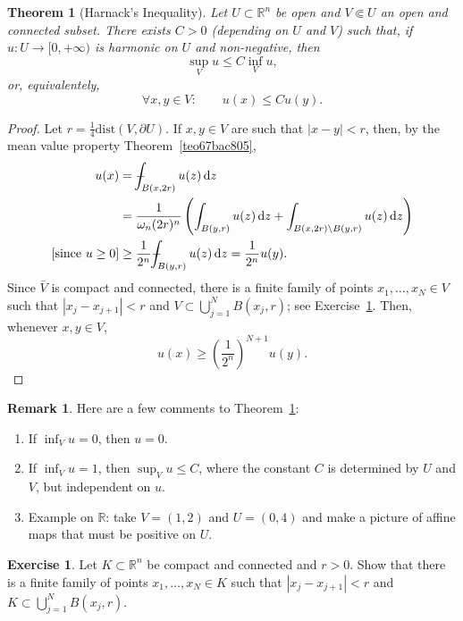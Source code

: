 \documentclass[a4paper,9pt]{amsart}
\newcommand{\R}{\mathbb{R}}	%
\newcommand{\did}{\,\mathrm{d}}	%
\newcommand{\de}{\partial}		%
\newcommand{\dist}{\mathrm{dist}}
\def\Xint#1{\mathchoice
      {\XXint\displaystyle\textstyle{#1}}%
      {\XXint\textstyle\scriptstyle{#1}}%
      {\XXint\scriptstyle\scriptscriptstyle{#1}}%
      {\XXint\scriptscriptstyle\scriptscriptstyle{#1}}%
      \!\int}
\def\XXint#1#2#3{{\setbox0=\hbox{$#1{#2#3}{\int}$}
        \vcenter{\hbox{$#2#3$}}\kern-.5\wd0}}
\def\fint{\Xint-}
\theoremstyle{plain}
\newtheorem{theorem}[proposition]{Theorem}
\theoremstyle{definition}
\newtheorem{remark}[proposition]{Remark}
\newtheorem{exercise}[proposition]{Exercise}%
\theoremstyle{remark}
\begin{document}
\begin{theorem}[Harnack's Inequality]\label{thm67bb79ea}
	Let $U\subset\R^n$ be open and $V\Subset U$ an open and connected subset.
	There exists $C>0$ (depending on $U$ and $V$) such that,
	if $u:U\to[0,+\infty)$ is harmonic on $U$ and non-negative, then
	\begin{equation}
		\sup_V u \le C \inf_V u ,
	\end{equation}
	or, equivalentely,
	\begin{equation}
		\forall x,y\in V:
		\qquad
		u(x) \le C u(y) .
	\end{equation}
\end{theorem}%
\begin{proof}
	Let $r=\frac14\dist(V,\de U)$.
	If $x,y\in V$ are such that $|x-y|<r$, then, by the mean value property Theorem~\ref{teo67bac805},
	\begin{align*}
		u(x) 
		&= \fint_{B(x,2r)} u(z) \did z \\
		&= \frac1{\omega_n (2r)^n} \left( \int_{B(y,r)} u(z)\did z + \int_{B(x,2r)\setminus B(y,r)} u(z) \did z \right) \\
		\text{[since $u\ge0$]}
		&\ge \frac1{2^n} \fint_{B(y,r)} u(z) \did z
		= \frac1{2^n} u(y) .
	\end{align*}
	Since $\bar V$ is compact and connected, there is a finite family of points $x_1,\dots,x_N\in V$ such that $|x_j-x_{j+1}|<r$ and $V\subset\bigcup_{j=1}^N B(x_j,r)$;
	see Exercise~\ref{ex688c8182}.
	Then, whenever $x,y\in V$,
	\[
	u(x) \ge \left( \frac1{2^n} \right)^{N+1} u(y) .
	\]
\end{proof}
\begin{remark}
	Here are a few comments to Theorem~\ref{thm67bb79ea}:
	\begin{enumerate}
		\item	If $\inf_V u=0$, then $u=0$.
		\item	If $\inf_V u=1$, then $\sup_V u \le C$, where the constant $C$ is determined by $U$ and $V$, but independent on $u$.
		\item	Example on $\R$: take $V=(1,2)$ and $U=(0,4)$ and make a picture of affine maps that must be positive on $U$.
	\end{enumerate}
\end{remark}

\begin{exercise}\label{ex688c8182}
	Let $K\subset\R^n$ be compact and connected and $r>0$.
	Show that there is a finite family of points $x_1,\dots,x_N\in K$ such that $|x_j-x_{j+1}|<r$ and $K\subset \bigcup_{j=1}^N B(x_j,r)$.
\end{exercise}
\end{document}
